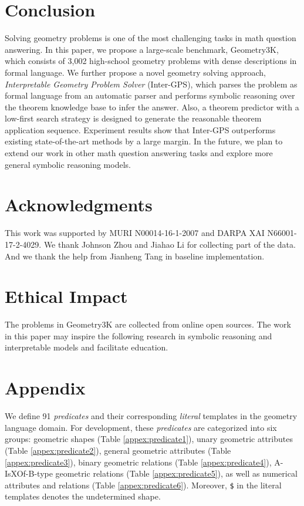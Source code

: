 \documentclass[11pt,a4paper]{article}
\begin{document}
\section{Conclusion}
Solving geometry problems is one of the most challenging tasks in math question answering. In this paper, we propose a large-scale benchmark, Geometry3K, which consists of 3,002 high-school geometry problems with dense descriptions in formal language. We further propose a novel geometry solving approach, \textit{Interpretable  Geometry Problem Solver} (Inter-GPS), which parses the problem as formal language from an automatic parser and performs symbolic reasoning over the theorem knowledge base to infer the answer. Also, a theorem predictor with a low-first search strategy is designed to generate the reasonable theorem application sequence. Experiment results show that Inter-GPS outperforms existing state-of-the-art methods by a large margin. In the future, we plan to extend our work in other math question answering tasks and explore more general symbolic reasoning models.

\section*{Acknowledgments}
This work was supported by MURI N00014-16-1-2007 and DARPA XAI N66001-17-2-4029. We thank Johnson Zhou and Jiahao Li for collecting part of the data. And we thank the help from Jianheng Tang in baseline implementation.

\section*{Ethical Impact}
The problems in Geometry3K are collected from online open sources. The work in this paper may inspire the following research in symbolic reasoning and interpretable models and facilitate education. 




\appendix

\section{Appendix}
We define 91 \textit{predicates} and their corresponding \textit{literal} templates in the geometry language domain. For development, these \textit{predicates} are categorized into six groups: geometric shapes (Table \ref{appex:predicate1}), unary geometric attributes (Table \ref{appex:predicate2}), general geometric attributes (Table \ref{appex:predicate3}), binary geometric relations (Table \ref{appex:predicate4}),  A-IsXOf-B-type geometric relations (Table \ref{appex:predicate5}), as well as numerical attributes and relations (Table \ref{appex:predicate6}). Moreover, \texttt{\$} in the literal templates denotes the undetermined shape.



\end{document}

